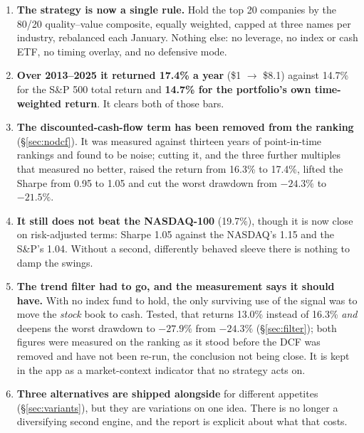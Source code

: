 \documentclass[11pt,a4paper]{article}
\begin{document}
\begin{enumerate}[leftmargin=1.4em,itemsep=0.35em]
  \item \textbf{The strategy is now a single rule.} Hold the top 20 companies
  by the 80/20 quality--value composite, equally weighted, capped at three
  names per industry, rebalanced each January. Nothing else: no leverage, no
  index or cash ETF, no timing overlay, and no defensive mode.

  \item \textbf{Over 2013--2025 it returned 17.4\% a year} (\$1 $\rightarrow$
  \$8.1) against 14.7\% for the S\&P 500 total return and \textbf{14.7\% for
  the portfolio's own time-weighted return}. It clears both of those bars.

  \item \textbf{The discounted-cash-flow term has been removed from the
  ranking} (\S\ref{sec:nodcf}). It was measured against thirteen years of
  point-in-time rankings and found to be noise; cutting it, and the three
  further multiples that measured no better, raised the return from 16.3\% to
  17.4\%, lifted the Sharpe from 0.95 to 1.05 and cut the worst drawdown from
  $-24.3\%$ to $-21.5\%$.

  \item \textbf{It still does not beat the NASDAQ-100} (19.7\%), though it is
  now close on risk-adjusted terms: Sharpe 1.05 against the NASDAQ's 1.15 and
  the S\&P's 1.04. Without a second, differently behaved sleeve there is
  nothing to damp the swings.

  \item \textbf{The trend filter had to go, and the measurement says it should
  have.} With no index fund to hold, the only surviving use of the signal was
  to move the \emph{stock} book to cash. Tested, that returns 13.0\% instead of
  16.3\% \emph{and} deepens the worst drawdown to $-27.9\%$ from $-24.3\%$
  (\S\ref{sec:filter}); both figures were measured on the ranking as it stood
  before the DCF was removed and have not been re-run, the conclusion not being
  close. It is kept in the app as a market-context indicator that no strategy
  acts on.

  \item \textbf{Three alternatives are shipped alongside} for different
  appetites (\S\ref{sec:variants}), but they are variations on one idea. There
  is no longer a diversifying second engine, and the report is explicit about
  what that costs.
\end{enumerate}
\end{document}
